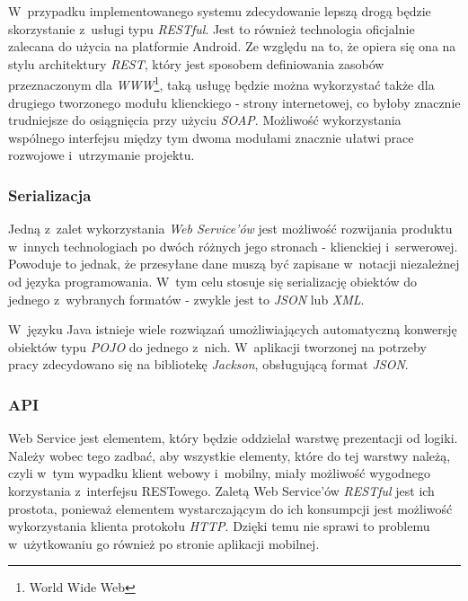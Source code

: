 \documentclass[11pt]{aghdpl}
\begin{document}
W~przypadku implementowanego systemu zdecydowanie lepszą drogą będzie skorzystanie z~usługi typu \emph{RESTful}. Jest to również technologia oficjalnie zalecana do użycia na platformie Android. Ze względu na to, że opiera się ona na stylu architektury \emph{REST}, który jest sposobem definiowania zasobów przeznaczonym dla \emph{WWW}\footnote{World Wide Web}, taką usługę będzie można wykorzystać także dla drugiego tworzonego modułu klienckiego - strony internetowej, co byłoby znacznie trudniejsze do osiągnięcia przy użyciu \emph{SOAP}. Możliwość wykorzystania wspólnego interfejsu między tym dwoma modułami znacznie ułatwi prace rozwojowe i~utrzymanie projektu.

\subsubsection{Serializacja}

Jedną z~zalet wykorzystania \emph{Web Service'ów} jest możliwość rozwijania produktu w~innych technologiach po dwóch różnych jego stronach - klienckiej i~serwerowej. Powoduje to jednak, że przesyłane dane muszą być zapisane w~notacji niezależnej od języka programowania. W~tym celu stosuje się serializację obiektów do jednego z~wybranych formatów - zwykle jest to \emph{JSON} lub \emph{XML}.

W~języku Java istnieje wiele rozwiązań umożliwiających automatyczną konwersję obiektów typu \emph{POJO} do jednego z~nich. W~aplikacji tworzonej na potrzeby pracy zdecydowano się na bibliotekę \emph{Jackson}, obsługującą format \emph{JSON}.

\subsubsection{API}

Web Service jest elementem, który będzie oddzielał warstwę prezentacji od logiki. Należy wobec tego zadbać, aby wszystkie elementy, które do tej warstwy należą, czyli w~tym wypadku klient webowy i~mobilny, miały możliwość wygodnego korzystania z~interfejsu RESTowego. Zaletą Web Service'ów \emph{RESTful} jest ich prostota, ponieważ elementem wystarczającym do ich konsumpcji jest możliwość wykorzystania klienta protokołu \emph{HTTP}. Dzięki temu nie sprawi to problemu w~użytkowaniu go również po stronie aplikacji mobilnej.
\end{document}
